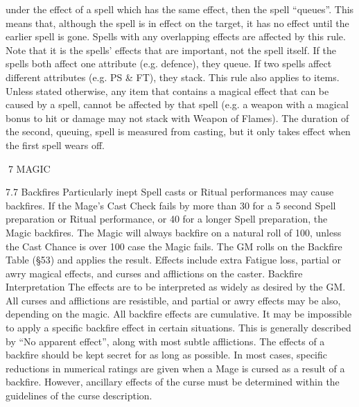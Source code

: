 \documentclass[a4paper]{article}
\begin{document}
\begin{multicols}{3}
under the effect of a spell which has the same
effect, then the spell “queues”. This means that,
although the spell is in effect on the target, it has
no effect until the earlier spell is gone.
Spells with any overlapping effects are affected by
this rule. Note that it is the spells’ effects that are
important, not the spell itself. If the spells both
affect one attribute (e.g. defence), they queue. If
two spells affect different attributes (e.g. PS & FT),
they stack. This rule also applies to items. Unless
stated otherwise, any item that contains a magical
effect that can be caused by a spell, cannot be
affected by that spell (e.g. a weapon with a magical
bonus to hit or damage may not stack with Weapon
of Flames).
The duration of the second, queuing, spell is measured from casting, but it only takes effect when the
first spell wears off.

7 MAGIC

7.7 Backfires
Particularly inept Spell casts or Ritual performances may cause backfires. If the Mage’s Cast
Check fails by more than 30 for a 5 second Spell
preparation or Ritual performance, or 40 for a
longer Spell preparation, the Magic backfires. The
Magic will always backfire on a natural roll of 100,
unless the Cast Chance is over 100%
case the Magic fails. The GM rolls on the Backfire
Table (§53) and applies the result. Effects include
extra Fatigue loss, partial or awry magical effects,
and curses and afflictions on the caster.
Backfire Interpretation
The effects are to be interpreted as widely as desired by the GM. All curses and afflictions are
resistible, and partial or awry effects may be also,
depending on the magic. All backfire effects are
cumulative. It may be impossible to apply a specific backfire effect in certain situations. This is
generally described by “No apparent effect”, along
with most subtle afflictions. The effects of a backfire should be kept secret for as long as possible.
In most cases, specific reductions in numerical
ratings are given when a Mage is cursed as a result
of a backfire. However, ancillary effects of the
curse must be determined within the guidelines of
the curse description.


\end{multicols}
\end{document}
